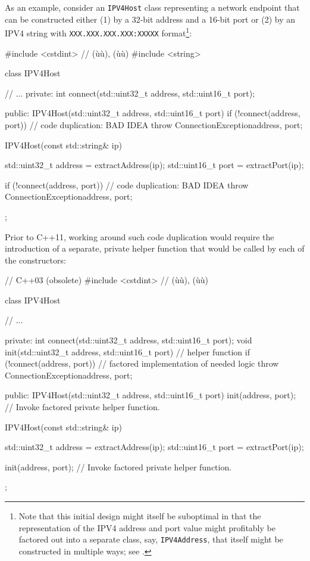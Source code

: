 As an example, consider an \lstinline!IPV4Host! class representing a
network endpoint that can be constructed either (1) by a 32-bit address
and a 16-bit port or (2) by an IPV4 string with
\lstinline!XXX.XXX.XXX.XXX:XXXXX! format{\cprotect\footnote{Note that
this initial design might itself be suboptimal in that the
representation of the IPV4 address and port value might profitably be
factored out into a separate  class, say,
\lstinline!IPV4Address!, that itself might be constructed in multiple ways;
  see .}}:

\begin{emcppslisting}[language=C++]
#include <cstdint> // (ù{}ù), (ù{}ù)
#include <string>

class IPV4Host
{
     // ...
private:
    int connect(std::uint32_t address, std::uint16_t port);

public:
    IPV4Host(std::uint32_t address, std::uint16_t port)
    {
        if (!connect(address, port))  // code duplication: BAD IDEA
        {
            throw ConnectionException{address, port};
        }
    }

    IPV4Host(const std::string& ip)
    {
        std::uint32_t address = extractAddress(ip);
        std::uint16_t port = extractPort(ip);

        if (!connect(address, port))  // code duplication: BAD IDEA
        {
            throw ConnectionException{address, port};
        }
    }
};
\end{emcppslisting}

\noindent Prior to C++11, working around such code duplication would require the
introduction of a separate, private helper function that
would be called by each of the constructors:

\begin{emcppslisting}[language=C++]
// C++03 (obsolete)
#include <cstdint>  // (ù{}ù), (ù{}ù)

class IPV4Host
{
    // ...

private:
    int connect(std::uint32_t address, std::uint16_t port);
    void init(std::uint32_t address, std::uint16_t port)  // helper function
    {
        if (!connect(address, port))  // factored implementation of needed logic
        {
            throw ConnectionException{address, port};
        }
    }

public:
    IPV4Host(std::uint32_t address, std::uint16_t port)
    {
        init(address, port);  // Invoke factored private helper function.
    }

    IPV4Host(const std::string& ip)
    {
        std::uint32_t address = extractAddress(ip);
        std::uint16_t port = extractPort(ip);

        init(address, port);  // Invoke factored private helper function.
    }
};
\end{emcppslisting}

